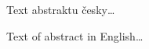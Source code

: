 \startAbstractCz
  Text abstraktu česky\dots
\stopAbstractCz

\startAbstractEn
  Text of abstract in English\dots
\stopAbstractEn

\endinput
